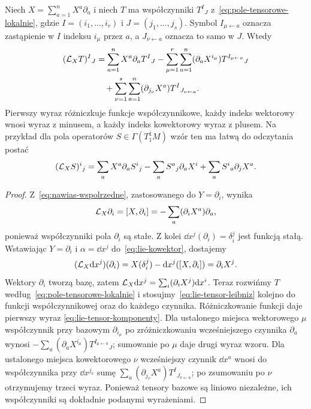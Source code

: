 \begin{twierdzenie}
\label{thm:lie-tensor-wspolrzedne}
Niech $X=\sum_{a=1}^nX^a\partial_a$ i niech $T$ ma
współczynniki $T^I{}_J$ z~\eqref{eq:pole-tensorowe-lokalnie},
gdzie $I=(i_1,\ldots,i_r)$ i $J=(j_1,\ldots,j_s)$.
Symbol $I_{\mu\leftarrow a}$ oznacza zastąpienie w $I$
indeksu $i_\mu$ przez $a$, a $J_{\nu\leftarrow a}$
oznacza to samo w $J$. Wtedy
\begin{equation}\label{eq:lie-tensor-komponenty}
\begin{aligned}
 (\mathcal L_XT)^I{}_J
 &=\sum_{a=1}^nX^a\partial_a T^I{}_J
 -\sum_{\mu=1}^r\sum_{a=1}^n
   (\partial_aX^{i_\mu})T^{I_{\mu\leftarrow a}}{}_J\\
 &\quad+\sum_{\nu=1}^s\sum_{a=1}^n
   (\partial_{j_\nu}X^a)T^I{}_{J_{\nu\leftarrow a}}.
\end{aligned}
\end{equation}
Pierwszy wyraz różniczkuje funkcje współczynnikowe,
każdy indeks wektorowy wnosi wyraz z minusem,
a każdy indeks kowektorowy wyraz z plusem.
Na przykład dla pola operatorów $S\in\Gamma(T^1_1M)$
wzór ten ma łatwą do odczytania postać
\[
 (\mathcal L_XS)^i{}_j
 =\sum_a X^a\partial_aS^i{}_j
  -\sum_a S^a{}_j\partial_aX^i
  +\sum_a S^i{}_a\partial_jX^a.
\]
\end{twierdzenie}
\begin{proof}
Z~\eqref{eq:nawias-wspolrzedne}, zastosowanego do
$Y=\partial_i$, wynika
\[
 \mathcal L_X\partial_i=[X,\partial_i]
 =-\sum_a(\partial_iX^a)\partial_a,
\]
ponieważ współczynniki pola $\partial_i$ są stałe.
Z kolei $\dd x^j(\partial_i)=\delta_i^j$ jest funkcją
stałą. Wstawiając $Y=\partial_i$ i $\alpha=\dd x^j$
do~\eqref{eq:lie-kowektor}, dostajemy
\[
 (\mathcal L_X\mathrm d x^j)(\partial_i)
 =X(\delta_i^j)-\mathrm d x^j([X,\partial_i])
 =\partial_iX^j.
\]
Wektory $\partial_i$ tworzą bazę, zatem
$\mathcal L_X\mathrm d x^j=\sum_i(\partial_iX^j)\mathrm d x^i$.
Teraz rozwińmy $T$ według~\eqref{eq:pole-tensorowe-lokalnie}
i stosujmy~\eqref{eq:lie-tensor-leibniz} kolejno
do funkcji współczynnikowej oraz do każdego czynnika.
Różniczkowanie funkcji daje pierwszy wyraz
\eqref{eq:lie-tensor-komponenty}. Dla ustalonego miejsca
wektorowego $\mu$ współczynnik przy bazowym
$\partial_{i_\mu}$ po zróżniczkowaniu wcześniejszego
czynnika $\partial_a$ wynosi
$-\sum_a(\partial_aX^{i_\mu})T^{I_{\mu\leftarrow a}}{}_J$;
sumowanie po $\mu$ daje drugi wyraz wzoru.
Dla ustalonego miejsca kowektorowego $\nu$ wcześniejszy
czynnik $\dd x^a$ wnosi do współczynnika przy
$\dd x^{j_\nu}$ sumę
$\sum_a(\partial_{j_\nu}X^a)T^I{}_{J_{\nu\leftarrow a}}$;
po zsumowaniu po $\nu$ otrzymujemy trzeci wyraz.
Ponieważ tensory bazowe są liniowo niezależne,
ich współczynniki są dokładnie podanymi wyrażeniami.
\end{proof}

